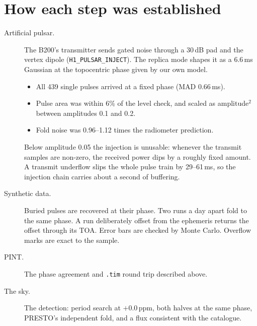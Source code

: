 \documentclass[11pt,a4paper]{article}
\newcommand{\code}[1]{\texttt{#1}}
\begin{document}
\section{How each step was established}
\label{sec:checks}
\begin{description}
\item[Artificial pulsar.] The B200's transmitter sends gated noise through a 30\,dB pad and the vertex dipole (\code{H1\_PULSAR\_INJECT}). The replica mode shapes it as a 6.6\,ms Gaussian at the topocentric phase given by our own model.
  \begin{itemize}
  \item All 439 single pulses arrived at a fixed phase (MAD 0.66\,ms).
  \item Pulse area was within 6\% of the level check, and scaled as amplitude$^2$ between amplitudes 0.1 and 0.2.
  \item Fold noise was 0.96--1.12 times the radiometer prediction.
  \end{itemize}
  Below amplitude 0.05 the injection is unusable: whenever the transmit samples are non-zero, the received power dips by a roughly fixed amount. A transmit underflow slips the whole pulse train by 29--61\,ms, so the injection chain carries about a second of buffering.
\item[Synthetic data.] Buried pulses are recovered at their phase. Two runs a day apart fold to the same phase. A run deliberately offset from the ephemeris returns the offset through its TOA. Error bars are checked by Monte Carlo. Overflow marks are exact to the sample.
\item[PINT.] The phase agreement and \code{.tim} round trip described above.
\item[The sky.] The detection: period search at $+0.0$\,ppm, both halves at the same phase, PRESTO's independent fold, and a flux consistent with the catalogue.
\end{description}

\end{document}
